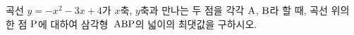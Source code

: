 곡선 $y=-x^2-3x+4$가 $x$축, $y$축과 만나는 두 점을 각각 $\mathrm{A}$, $\mathrm{B}$라 할 때, 곡선 위의 한 점 $\mathrm{P}$에 대하여 삼각형~$\mathrm{ABP}$의 넓이의 최댓값을 구하시오. 
